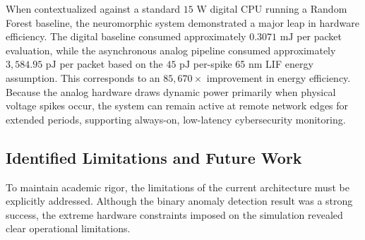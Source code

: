 \documentclass{ieeeaccess}
\begin{document}
When contextualized against a standard $15\text{ W}$ digital CPU running a Random Forest baseline, the neuromorphic system demonstrated a major leap in hardware efficiency. The digital baseline consumed approximately $0.3071\text{ mJ}$ per packet evaluation, while the asynchronous analog pipeline consumed approximately $3{,}584.95\text{ pJ}$ per packet based on the $45\text{ pJ}$ per-spike 65 nm LIF energy assumption. This corresponds to an $85{,}670\times$ improvement in energy efficiency. Because the analog hardware draws dynamic power primarily when physical voltage spikes occur, the system can remain active at remote network edges for extended periods, supporting always-on, low-latency cybersecurity monitoring.

\subsection{Identified Limitations and Future Work}
To maintain academic rigor, the limitations of the current architecture must be explicitly addressed. Although the binary anomaly detection result was a strong success, the extreme hardware constraints imposed on the simulation revealed clear operational limitations.
\end{document}
